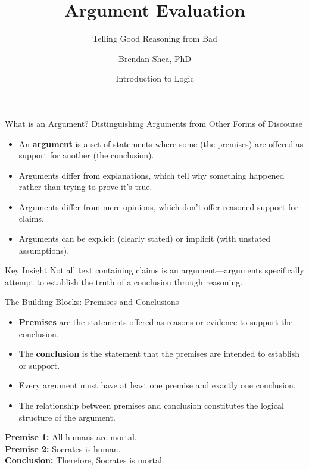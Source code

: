 \documentclass{beamer}
\title{Argument Evaluation}
\subtitle{Telling Good Reasoning from Bad}
\author{Brendan Shea, PhD}
\date{Introduction to Logic}
\begin{document}
\begin{frame}
    \titlepage
\end{frame}

\begin{frame}{What is an Argument? Distinguishing Arguments from Other Forms of Discourse}
    \begin{itemize}
        \item An \textbf{argument} is a set of statements where some (the premises) are offered as support for another (the conclusion).
        \item Arguments differ from explanations, which tell why something happened rather than trying to prove it's true.
        \item Arguments differ from mere opinions, which don't offer reasoned support for claims.
        \item Arguments can be explicit (clearly stated) or implicit (with unstated assumptions).
    \end{itemize}
    
    \begin{alertblock}{Key Insight}
        Not all text containing claims is an argument—arguments specifically attempt to establish the truth of a conclusion through reasoning.
    \end{alertblock}
\end{frame}

\begin{frame}{The Building Blocks: Premises and Conclusions}
    \begin{itemize}
        \item \textbf{Premises} are the statements offered as reasons or evidence to support the conclusion.
        \item The \textbf{conclusion} is the statement that the premises are intended to establish or support.
        \item Every argument must have at least one premise and exactly one conclusion.
        \item The relationship between premises and conclusion constitutes the logical structure of the argument.
    \end{itemize}
    
    \begin{example}
        \textbf{Premise 1:} All humans are mortal.\\
        \textbf{Premise 2:} Socrates is human.\\
        \textbf{Conclusion:} Therefore, Socrates is mortal.
    \end{example}
\end{frame}
\end{document}

